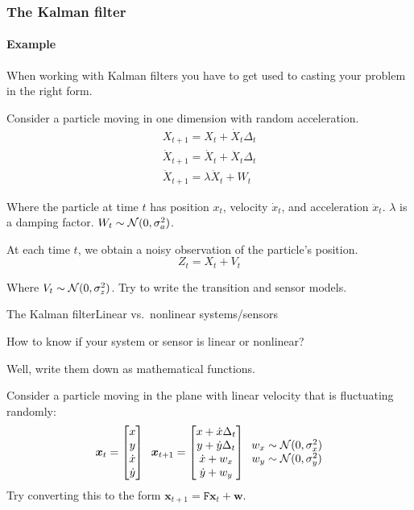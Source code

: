 \documentclass[aspectratio=169]{beamer}
\renewcommand{\vec}[1]{\boldsymbol{#1}}
\newcommand{\mat}[1]{\mathtt{#1}}
\def\norm{\mbox{$\cal{N}$}}
\begin{document}
\begin{frame}
\frametitle{The Kalman filter}
\framesubtitle{Example}

When working with Kalman filters you have to get used to casting your
problem in the right form.

\medskip

Consider a particle moving in one dimension with \alert{random acceleration}.
\begin{gather*}
X_{t+1} = X_t + \dot{X}_t \Delta_t \\
\dot{X}_{t+1} = \dot{X}_t + \ddot{X}_t \Delta_t \\
\ddot{X}_{t+1} = \lambda \ddot{X}_t + W_t
\end{gather*}

Where the particle at time $t$ has position $x_t$, velocity
$\dot{x}_t$, and acceleration $\ddot{x}_t$.  $\lambda$ is a damping
factor.  $W_t \sim \norm(0,\sigma_a^2)$.

\medskip

At each time $t$, we obtain a noisy observation of the particle's
position.
\begin{equation*}
Z_t = X_t + V_t
\end{equation*}

Where $V_t \sim \norm(0,\sigma_z^2)$.
Try to \alert{write the transition and sensor models}.

\end{frame}

\begin{frame}{The Kalman filter}{Linear vs.\ nonlinear systems/sensors}

How to know if your system or sensor is linear or nonlinear?

\medskip

Well, write them down as mathematical functions.

\medskip

Consider a particle moving in the plane with linear velocity
that is fluctuating randomly:
$$ \vec{x}_t = \begin{bmatrix} x \\ y \\ \dot{x} \\ \dot{y} \end{bmatrix} \;\;
   \vec{x}_{t+1} = \begin{bmatrix} x + \dot{x} \Delta_t \\
                                   y + \dot{y} \Delta_t \\
                                   \dot{x} + w_x \\
                                   \dot{y} + w_y \end{bmatrix} \; \;
            \begin{matrix} w_x \sim {\cal N}(0,\sigma^2_x) \\
                           w_y \sim {\cal N}(0,\sigma^2_y) \end{matrix}
$$
Try converting this to the form $\vec{x}_{t+1} = \mat{F}\vec{x}_t + \vec{w}$.

\end{frame}
\end{document}

